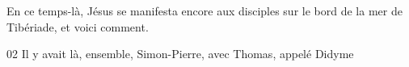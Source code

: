 En ce temps-là, Jésus se manifesta encore aux disciples sur le bord de la mer de Tibériade, et voici comment.

02 Il y avait là, ensemble, Simon-Pierre, avec Thomas, appelé Didyme